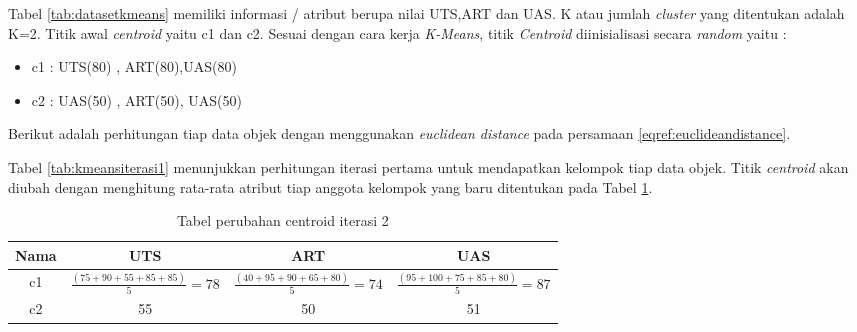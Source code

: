 Tabel \ref{tab:datasetkmeans} memiliki informasi  / atribut berupa nilai UTS,ART dan UAS. K atau jumlah \textit{cluster} yang ditentukan adalah K=2. Titik awal \textit{centroid} yaitu c1 dan c2. Sesuai dengan cara kerja \textit{K-Means}, titik \textit{Centroid} diinisialisasi secara \textit{random} yaitu : 

\begin{itemize}
\item c1 : UTS(80) , ART(80),UAS(80)
\item c2 : UAS(50) , ART(50), UAS(50)
\end{itemize}

Berikut adalah perhitungan tiap data objek dengan menggunakan \textit{euclidean distance} pada persamaan \eqref{eqref:euclideandistance}.

\begin{table}[H]
\caption{Tabel perhitungan k-Means iterasi ke-1}
\centering
{}
\label{tab:kmeansiterasi1}
\end{table} 

Tabel \ref{tab:kmeansiterasi1} menunjukkan perhitungan iterasi pertama untuk mendapatkan kelompok tiap data objek. Titik \textit{centroid} akan diubah dengan menghitung rata-rata atribut tiap anggota kelompok yang baru ditentukan pada Tabel \ref{tab:centroid1}.

\begin{table}[H]
\caption{Tabel perubahan centroid iterasi 2}
\centering
\begin{tabular}{|c|c|c|c|}
\hline 
Nama & UTS & ART & UAS \\ 
\hline 
c1 & $\frac{(75+90+55+85+85)}{5} =  78$ & $ \frac{(40+95+90+65+80)}{5} = 74$ & $\frac{(95+100+75+85+80)}{5} = 87$ \\ 
\hline 
c2 & 55 & 50 & 51 \\ 
\hline 
\end{tabular} 
\label{tab:centroid1}
\end{table}

